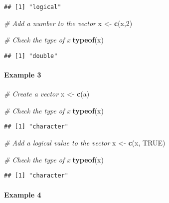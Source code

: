 \documentclass[
]{article}
\newenvironment{Shaded}{\begin{snugshade}}{\end{snugshade}}
\newcommand{\CommentTok}[1]{\textcolor[rgb]{0.56,0.35,0.01}{\textit{#1}}}
\newcommand{\ConstantTok}[1]{\textcolor[rgb]{0.56,0.35,0.01}{#1}}
\newcommand{\DecValTok}[1]{\textcolor[rgb]{0.00,0.00,0.81}{#1}}
\newcommand{\FunctionTok}[1]{\textcolor[rgb]{0.13,0.29,0.53}{\textbf{#1}}}
\newcommand{\NormalTok}[1]{#1}
\newcommand{\OtherTok}[1]{\textcolor[rgb]{0.56,0.35,0.01}{#1}}
\newcommand{\StringTok}[1]{\textcolor[rgb]{0.31,0.60,0.02}{#1}}
\begin{document}
\begin{verbatim}
## [1] "logical"
\end{verbatim}

\begin{Shaded}
\begin{Highlighting}[]
\CommentTok{\# Add a number to the vector}
\NormalTok{x }\OtherTok{\textless{}{-}} \FunctionTok{c}\NormalTok{(x,}\DecValTok{2}\NormalTok{)}

\CommentTok{\# Check the type of x}
\FunctionTok{typeof}\NormalTok{(x)}
\end{Highlighting}
\end{Shaded}

\begin{verbatim}
## [1] "double"
\end{verbatim}

\hypertarget{example-3}{%
\paragraph{Example 3}\label{example-3}}

\begin{Shaded}
\begin{Highlighting}[]
\CommentTok{\# Create a vector}
\NormalTok{x }\OtherTok{\textless{}{-}} \FunctionTok{c}\NormalTok{(}\StringTok{\textquotesingle{}a\textquotesingle{}}\NormalTok{)}

\CommentTok{\# Check the type of x}
\FunctionTok{typeof}\NormalTok{(x)}
\end{Highlighting}
\end{Shaded}

\begin{verbatim}
## [1] "character"
\end{verbatim}

\begin{Shaded}
\begin{Highlighting}[]
\CommentTok{\# Add a logical value to the vector}
\NormalTok{x }\OtherTok{\textless{}{-}} \FunctionTok{c}\NormalTok{(x, }\ConstantTok{TRUE}\NormalTok{)}

\CommentTok{\# Check the type of x}
\FunctionTok{typeof}\NormalTok{(x)}
\end{Highlighting}
\end{Shaded}

\begin{verbatim}
## [1] "character"
\end{verbatim}

\hypertarget{example-4}{%
\paragraph{Example 4}\label{example-4}}
\end{document}
